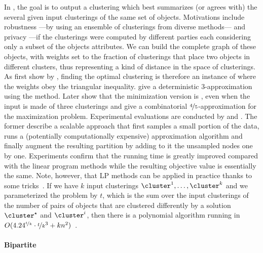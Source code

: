 In \msc{}, the goal is to output a clustering which best summarizes (or agrees with) the several
given input clusterings of the same set of objects.  Motivations include robustness ---by using an
ensemble of clusterings from diverse methods--- and privacy ---if the clusterings were computed by
different parties each considering only a subset of the objects attributes. We can build the
complete graph of these objects, with weights set to the fraction of clusterings that place two
objects in different clusters, thus representing a kind of distance in the space of clusterings.  As
first show by \textcite{EarlyConsensusClustering03} , finding the optimal clustering is therefore
an instance of \pcc{} where the weights obey the triangular inequality. \textcite{Gionis2007} give a
deterministic $3$-approximation using the \regionGrow{} method. Later \textcite{Bonizzoni2008} show that
the minimization version is \APXh{}, even when the input is made of three clusterings and give a
combinatorial $\nicefrac{4}{5}$-approximation for the maximization problem. Experimental evaluations are
conducted by \textcite{Bertolacci07} and \textcite{Filkov08}. The former describe a scalable
approach that first samples a small portion of the data, runs a (potentially computationally
expensive) approximation algorithm and finally augment the resulting partition by adding to it the
unsampled nodes one by one.  Experiments confirm that the running time is greatly improved compared
with the linear program methods while the resulting objective value is essentially the same. Note,
however, that LP methods can be applied in practice thanks to some tricks~\autocite{ConsensusLP10}.
If we have $k$ input clusterings $\cluster^1,\ldots,\cluster^k$ and we parameterized the problem by
$t$, which is the sum over the input clusterings of the number of pairs of objects that are clustered
differently by a solution $\cluster^\star$ and $\cluster^i$, then there is a polynomial algorithm
running in $O(4.24^{\nicefrac{t}{k}}\cdot \nicefrac{t}{k}^3 +
kn^2)$~\autocite{parameterizedConsensus14}.

\paragraph{Bipartite \pcc{}}

